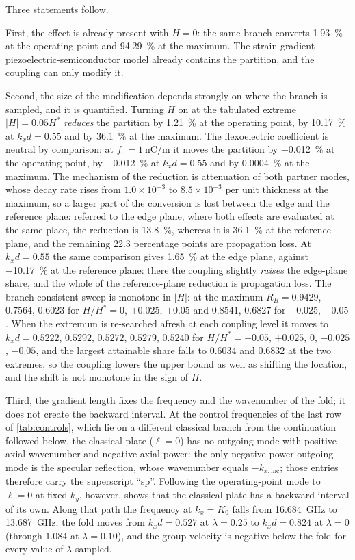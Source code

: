 Three statements follow.

First, the effect is already present with $H=0$: the same branch converts
\SI{1.93}{\percent} at the operating point and \SI{94.29}{\percent} at the
maximum.  The strain-gradient piezoelectric-semiconductor model already contains the partition, and the coupling can only modify it.

Second, the size of the modification depends strongly on where the branch is
sampled, and it is quantified.  Turning $H$ on at the tabulated extreme
$|H|=0.05H^{*}$ \emph{reduces} the partition by \SI{1.21}{\percent} at the
operating point, by \SI{10.17}{\percent} at $k_xd=0.55$ and by
\SI{36.1}{\percent} at the maximum.  The flexoelectric coefficient is
neutral by comparison: at $f_0=\SI{1}{\nano\coulomb\per\metre}$ it moves the
partition by \SI{-0.012}{\percent} at the operating point, by
\SI{-0.012}{\percent} at $k_xd=0.55$ and by \SI{0.0004}{\percent} at the
maximum.  The mechanism of the reduction is
attenuation of both partner modes, whose decay rate rises from
$1.0\times10^{-3}$ to $8.5\times10^{-3}$ per unit thickness at the maximum, so a
larger part of the conversion is lost between the edge and the reference plane:
referred to the edge plane, where both effects are evaluated at the same place,
the reduction is \SI{13.8}{\percent}, whereas it is \SI{36.1}{\percent} at the reference plane, and the
remaining 22.3 percentage points are propagation loss.  At $k_xd=0.55$ the same
comparison gives \SI{1.65}{\percent} at the edge plane, against \SI{-10.17}{\percent} at the reference plane: there the
coupling slightly \emph{raises} the edge-plane share, and the whole of the
reference-plane reduction is propagation loss.  The
branch-consistent sweep is monotone in $|H|$: at the maximum
$R_B=0.9429$, $0.7564$, $0.6023$ for $H/H^{*}=0$, $+0.025$, $+0.05$ and
$0.8541$, $0.6827$ for $-0.025$, $-0.05$.  When the extremum is re-searched
afresh at each coupling level it moves to $k_xd=0.5222$, $0.5292$, $0.5272$,
$0.5279$, $0.5240$ for $H/H^{*}=+0.05$, $+0.025$, $0$, $-0.025$, $-0.05$, and
the largest attainable share falls to $0.6034$ and $0.6832$ at the two extremes,
so the coupling lowers the upper bound as well as shifting the location, and the
shift is not monotone in the sign of $H$.

Third, the gradient length fixes the frequency and the wavenumber of the fold;
it does not create the backward interval.  At the control frequencies of the last
row of \cref{tab:controls}, which lie on a different classical branch from the continuation followed below, the classical plate ($\ell=0$) has no outgoing mode with
positive axial wavenumber and negative axial power: the only negative-power
outgoing mode is the specular reflection, whose wavenumber equals $-k_{x,\text{inc}}$; those entries therefore carry the superscript ``sp''.
Following the operating-point mode to $\ell=0$ at fixed $k_y$, however, shows that
the classical plate has a backward interval of its own.  Along that path the frequency at $k_x=K_0$ falls from \SI{16.684}{\giga\hertz} to \SI{13.687}{\giga\hertz}, the fold moves from $k_xd=0.527$ at $\lambda=0.25$ to $k_xd=0.824$ at $\lambda=0$ (through $1.084$ at $\lambda=0.10$), and the group velocity is negative below the fold for every value of $\lambda$ sampled.


